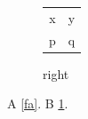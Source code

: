 \documentclass{article}
\begin{document}
\begin{figure}
\begin{tabular}{cc}
\begin{minipage}{4cm}x\caption{left}\label{fa}\end{minipage} & \begin{minipage}{4cm}y\caption{right}\label{fb}\end{minipage}\\
p & q
\end{tabular}
\end{figure}
A \cref{fa}. B \cref{fb}.
\end{document}
